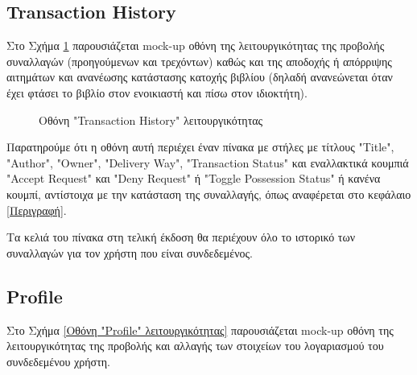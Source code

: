 \documentclass[12pt,a4paper]{article}
\begin{document}
\subsection{Transaction History}

Στο Σχήμα \ref{Οθόνη "Transaction History" λειτουργικότητας} παρουσιάζεται mock-up οθόνη της λειτουργικότητας της προβολής συναλλαγών (προηγούμενων και τρεχόντων) καθώς και της αποδοχής ή απόρριψης αιτημάτων και ανανέωσης κατάστασης κατοχής βιβλίου (δηλαδή ανανεώνεται όταν έχει φτάσει το βιβλίο στον ενοικιαστή και πίσω στον ιδιοκτήτη).

\begin{figure}[H]
	\caption{Οθόνη "Transaction History" λειτουργικότητας}
	\label{Οθόνη "Transaction History" λειτουργικότητας}
\end{figure}

Παρατηρούμε ότι η οθόνη αυτή περιέχει έναν πίνακα με στήλες με τίτλους "Title", "Author", "Owner", "Delivery Way", "Transaction Status" και εναλλακτικά κουμπιά "Accept Request" και "Deny Request" ή "Toggle Possession Status" ή κανένα κουμπί, αντίστοιχα με την κατάσταση της συναλλαγής, όπως αναφέρεται στο κεφάλαιο \ref{Περιγραφή}.

Τα κελιά του πίνακα στη τελική έκδοση θα περιέχουν όλο το ιστορικό των συναλλαγών για τον χρήστη που είναι συνδεδεμένος.

\subsection{Profile}

Στο Σχήμα \ref{Οθόνη "Profile" λειτουργικότητας} παρουσιάζεται mock-up οθόνη της λειτουργικότητας της προβολής και αλλαγής των στοιχείων του λογαριασμού του συνδεδεμένου χρήστη.
\end{document}
